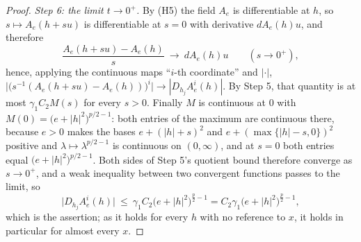 \begin{proof}
\emph{Step 6: the limit $t\to0^+$.}  By (H5) the field $A_e$ is differentiable
at $h$, so $s\mapsto A_e(h+su)$ is differentiable at $s=0$ with derivative
$dA_e(h)u$, and therefore
\[
\frac{A_e(h+su)-A_e(h)}{s}\ \longrightarrow\ dA_e(h)u
\qquad(s\to0^+),
\]
hence, applying the continuous maps ``$i$-th coordinate'' and $|\cdot|$,
$\bigl|\bigl(s^{-1}(A_e(h+su)-A_e(h))\bigr)^i\bigr|\to|D_{h_j}A_e^i(h)|$.  By
Step 5, that quantity is at most $\gamma_1C_2M(s)$ for every $s>0$.  Finally
$M$ is continuous at $0$ with
$M(0)=\bigl(e+|h|^2\bigr)^{p/2-1}$: both entries of the maximum are continuous
there, because $e>0$ makes the bases $e+(|h|+s)^2$ and
$e+(\max\{|h|-s,0\})^2$ positive and $\lambda\mapsto\lambda^{p/2-1}$ is
continuous on $(0,\infty)$, and at $s=0$ both entries equal
$\bigl(e+|h|^2\bigr)^{p/2-1}$.  Both sides of Step 5's quotient bound
therefore converge as $s\to0^+$, and a weak inequality between two convergent
functions passes to the limit, so
\[
\bigl|D_{h_j}A_e^i(h)\bigr|\ \le\ \gamma_1C_2\bigl(e+|h|^2\bigr)^{\frac p2-1}
=C_2\gamma_1\bigl(e+|h|^2\bigr)^{\frac p2-1},
\]
which is the assertion; as it holds for every $h$ with no reference to $x$, it
holds in particular for almost every $x$.
\end{proof}
